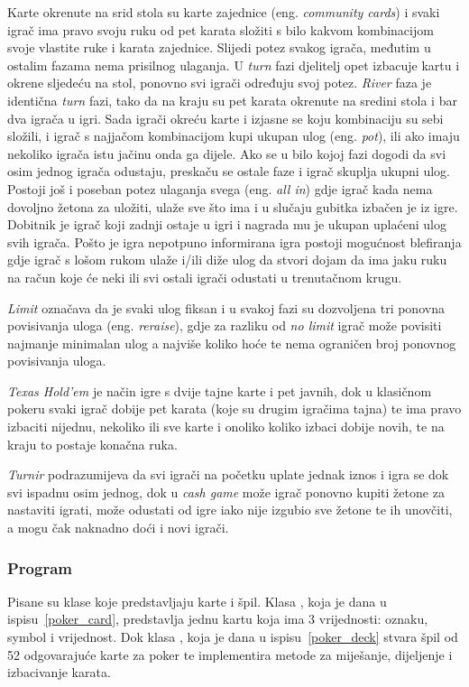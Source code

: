 Karte okrenute na srid stola su karte zajednice (eng. \textit{community cards}) i svaki igrač ima pravo svoju ruku od pet karata složiti s bilo kakvom kombinacijom svoje vlastite ruke i karata zajednice. Slijedi potez svakog igrača, međutim u ostalim fazama nema prisilnog ulaganja. U \emph{turn} fazi djelitelj opet izbacuje kartu i okrene sljedeću na stol, ponovno svi igrači određuju svoj potez. \emph{River} faza je identična \emph{turn} fazi, tako da na kraju su pet karata okrenute na sredini stola i bar dva igrača u igri. Sada igrači okreću karte i izjasne se koju kombinaciju su sebi složili, i igrač s najjačom kombinacijom kupi ukupan ulog (eng. \textit{pot}), ili ako imaju nekoliko igrača istu jačinu onda ga dijele. Ako se u bilo kojoj fazi dogodi da svi osim jednog igrača odustaju, preskaču se ostale faze i igrač skuplja ukupni ulog. Postoji još i poseban potez ulaganja svega (eng. \textit{all in}) gdje igrač kada nema dovoljno žetona za uložiti, ulaže sve što ima i u slučaju gubitka izbačen je iz igre. Dobitnik je igrač koji zadnji ostaje u igri i nagrada mu je ukupan uplaćeni ulog svih igrača. Pošto je igra nepotpuno informirana igra postoji mogućnost blefiranja gdje igrač s lošom rukom ulaže i/ili diže ulog da stvori dojam da ima jaku ruku na račun koje će neki ili svi ostali igrači odustati u trenutačnom krugu.


\emph{Limit} označava da je svaki ulog fiksan i u svakoj fazi su dozvoljena tri ponovna povisivanja uloga (eng. \textit{reraise}), gdje za razliku od \emph{no limit} igrač može povisiti najmanje minimalan ulog a najviše koliko hoće te nema ograničen broj ponovnog povisivanja uloga.

\emph{Texas Hold'em} je način igre s dvije tajne karte i pet javnih, dok u klasičnom pokeru svaki igrač dobije pet karata (koje su drugim igračima tajna) te ima pravo izbaciti nijednu, nekoliko ili sve karte i onoliko koliko izbaci dobije novih, te na kraju to postaje konačna ruka.

\emph{Turnir} podrazumijeva da svi igrači na početku uplate jednak iznos i igra se dok svi ispadnu osim jednog, dok u \emph{cash game} može igrač ponovno kupiti žetone za nastaviti igrati, može odustati od igre 
iako nije izgubio sve žetone te ih unovčiti, a mogu čak naknadno doći i novi igrači.

\subsubsection{Program}
Pisane su klase koje predstavljaju karte i špil. Klasa , koja je dana u ispisu~\ref{poker_card}, predstavlja jednu kartu koja ima 3 vrijednosti: oznaku, symbol i vrijednost. Dok klasa , koja je dana u ispisu~\ref{poker_deck} stvara špil od 52 odgovarajuće karte za poker te implementira metode za miješanje, dijeljenje i izbacivanje karata.


